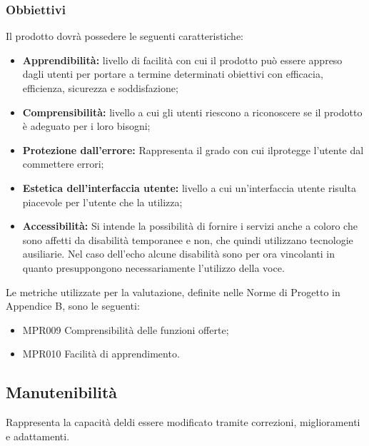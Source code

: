 \subsubsection{Obbiettivi } Il prodotto dovrà possedere le seguenti caratteristiche:
\begin{itemize}
	\item \textbf{Apprendibilità:} livello di facilità con cui il prodotto può essere appreso dagli utenti per portare a termine determinati obiettivi con efficacia, efficienza, sicurezza e soddisfazione;
	\item \textbf{Comprensibilità:} livello a cui gli utenti riescono a riconoscere se il prodotto è adeguato per i loro bisogni;
	\item \textbf{Protezione dall'errore:} Rappresenta il grado con cui ilprotegge l'utente dal commettere errori;
	\item \textbf{Estetica dell'interfaccia utente:} livello a cui un'interfaccia utente risulta piacevole per l'utente che la utilizza;
	\item \textbf{Accessibilità:} Si intende la possibilità di fornire i servizi anche a coloro che sono affetti da disabilità temporanee e non, che quindi utilizzano tecnologie ausiliarie.
	Nel caso dell'echo alcune disabilità sono per ora vincolanti in quanto presuppongono necessariamente l'utilizzo della voce.
\end{itemize}
Le metriche utilizzate per la valutazione, definite nelle Norme di Progetto in Appendice B, sono le seguenti:
\begin{itemize}
	\item MPR009 Comprensibilità delle funzioni offerte;
	\item MPR010 Facilità di apprendimento.
\end{itemize}

\subsection{Manutenibilità}
Rappresenta la capacità deldi essere modificato tramite correzioni, miglioramenti e adattamenti.
